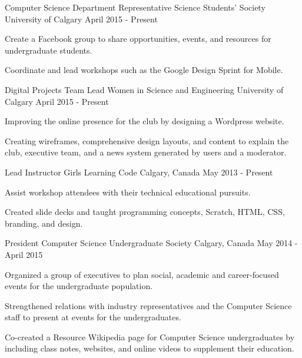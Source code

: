 \begin{cventries}
  \cventry
    {Computer Science Department Representative}
    {Science Students' Society}
    {University of Calgary}
    {April 2015 - Present}
    {
      \begin{cvitems}
        \item {Create a Facebook group to share opportunities, events, and resources for undergraduate students.}
        \item {Coordinate and lead workshops such as the Google Design Sprint for Mobile.}
      \end{cvitems}
    }
  \cventry
    {Digital Projects Team Lead}
    {Women in Science and Engineering}
    {University of Calgary}
    {April 2015 - Present}
    {
      \begin{cvitems}
        \item {Improving the online presence for the club by designing a Wordpress website.}
        \item {Creating wireframes, comprehensive design layouts, and content to explain the club, executive team, and a news system generated by users and a moderator.}
      \end{cvitems}
    }
  \cventry
    {Lead Instructor}
    {Girls Learning Code}
    {Calgary, Canada}
    {May 2013 - Present}
    {
      \begin{cvitems}
        \item {Assist workshop attendees with their technical educational pursuits.}
        \item {Created slide decks and taught programming concepts, Scratch, HTML, CSS, branding, and design.}
      \end{cvitems}
    }
  \cventry
    {President}
    {Computer Science Undergraduate Society}
    {Calgary, Canada}
    {May 2014 - April 2015}
    {
      \begin{cvitems}
        \item {Organized a group of executives to plan social, academic and career-focused events for the undergraduate population.}
        \item {Strengthened relations with industry representatives and the Computer Science staff to present at events for the undergraduates.}
        \item {Co-created a Resource Wikipedia page for Computer Science undergraduates by including class notes, websites, and online videos to supplement their education.}
      \end{cvitems}
}
\end{cventries}
